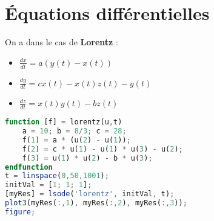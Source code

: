     \section{Équations différentielles}
        On a dans le cas de \textbf{Lorentz} :
        \begin{itemize}
            \item $\frac{dx}{dt} = a(y(t)-x(t))$
            \item $\frac{dy}{dt} = cx(t) - x(t)z(t) - y(t)$
            \item $\frac{dz}{dt} = x(t)y(t) - bz(t)$
        \end{itemize}

        \begin{lstlisting}[language=Octave]
function [f] = lorentz(u,t)
	a = 10; b = 8/3; c = 28;
	f(1) = a * (u(2) - u(1));
	f(2) = c * u(1) - u(1) * u(3) - u(2);
	f(3) = u(1) * u(2) - b * u(3);
endfunction
t = linspace(0,50,1001);
initVal = [1; 1; 1];
[myRes] = lsode('lorentz', initVal, t);
plot3(myRes(:,1), myRes(:,2), myRes(:,3));
figure;
        \end{lstlisting}


    
